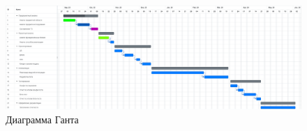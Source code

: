 
\begin{figure}[H]
    \centering
    \includegraphics[width=1.2\textwidth, angle=90]{Диаграмма Ганта.png}
    \caption{Диаграмма Ганта}\label{Диаграмма Ганта.png}
\end{figure}


